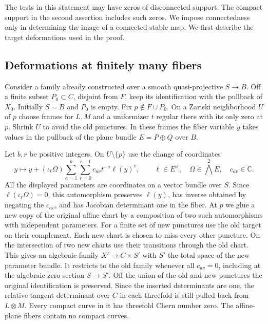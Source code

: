 The tests in this statement may have zeros of disconnected support.
The compact support in the second assertion includes such zeros. We
impose connectedness only in determining the image of a connected
stable map. We first describe the target deformations used in the
proof.

\subsection{Deformations at finitely many fibers}

Consider a family already constructed over a smooth quasi-projective
$S\to B$. Off a finite subset $P_0\subset C$, disjoint from $F$,
keep its identification with the pullback of $X_0$. Initially $S=B$
and $P_0$ is empty. Fix $p\notin F\cup P_0$. On a Zariski neighborhood
$U$ of $p$ choose frames for $L,M$ and a uniformizer $t$ regular
there with its only zero at $p$. Shrink $U$ to avoid the old punctures.
In these frames the fiber variable $y$ takes values in the pullback
of the plane bundle $E=P\oplus Q$ over $B$.

Let $b,r$ be positive integers. On $U\setminus\{p\}$ use the change
of coordinates
\begin{equation}\label{eq:shear-gluing}
 y\longmapsto y+(\iota_\ell\Omega)
           \sum_{a=1}^b\sum_{v=0}^{r-1} c_{av}t^{-a}\ell(y)^v,
 \qquad
 \ell\in E^\vee,\quad \Omega\in\bigwedge^2 E,\quad c_{av}\in\mathbb C .
\end{equation}
All the displayed parameters are coordinates on a vector bundle over
$S$. Since $\ell(\iota_\ell\Omega)=0$, this automorphism preserves
$\ell(y)$, has inverse obtained by negating the $c_{av}$, and has
Jacobian determinant one in the fiber. At $p$ we glue a new copy of
the original affine chart by a composition of two such automorphisms
with independent parameters. For a finite set of new punctures use
the old target on their complement. Each new chart is chosen to miss
every other puncture. On the intersection of two new charts use their
transitions through the old chart. This gives an algebraic family
$X'\to C\times S'$ with $S'$ the total space of the new parameter
bundle. It restricts to the old family whenever all $c_{av}=0$,
including at the algebraic zero section $S\to S'$. Off the union of
the old and new punctures the original identification is preserved.
Since the inserted determinants are one, the relative tangent
determinant over $C$ in each threefold is still pulled back from
$L\otimes M$. Every compact curve in it has threefold Chern number
zero. The affine-plane fibers contain no compact curves.

